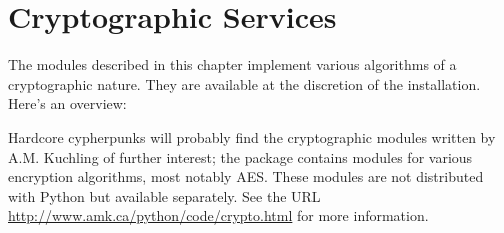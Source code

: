 \chapter{Cryptographic Services}
\label{crypto}

The modules described in this chapter implement various algorithms of
a cryptographic nature.  They are available at the discretion of the
installation.  Here's an overview:

\localmoduletable

Hardcore cypherpunks will probably find the cryptographic modules
written by A.M. Kuchling of further interest; the package contains
modules for various encryption algorithms, most notably AES.  These modules
are not distributed with Python but available separately.  See the URL
\url{http://www.amk.ca/python/code/crypto.html} 
for more information.
